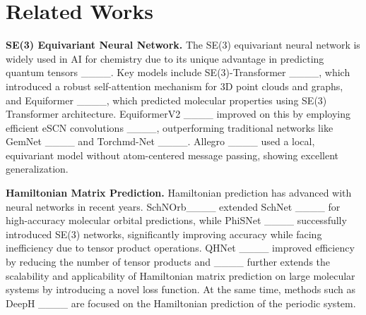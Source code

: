 \section{Related Works}
\textbf{SE(3) Equivariant Neural Network.} 
The SE(3) equivariant neural network is widely used in AI for chemistry due to its unique advantage in predicting quantum tensors ____. Key models include SE(3)-Transformer ____, which introduced a robust self-attention mechanism for 3D point clouds and graphs, and Equiformer ____, which predicted molecular properties using SE(3) Transformer architecture. EquiformerV2 ____ improved on this by employing efficient eSCN convolutions ____, outperforming traditional networks like GemNet ____ and Torchmd-Net ____. Allegro ____ used a local, equivariant model without atom-centered message passing, showing excellent generalization. 

\textbf{Hamiltonian Matrix Prediction.} 
Hamiltonian prediction has advanced with neural networks in recent years. SchNOrb____ extended SchNet ____ for high-accuracy molecular orbital predictions, while PhiSNet ____ successfully introduced SE(3) networks, significantly improving accuracy while facing inefficiency due to tensor product operations. QHNet ____ improved efficiency by reducing the number of tensor products and ____ further extends the scalability and applicability of Hamiltonian matrix prediction on large molecular systems by introducing a novel loss function. At the same time, methods such as DeepH ____ are focused on the Hamiltonian prediction of the periodic system.


